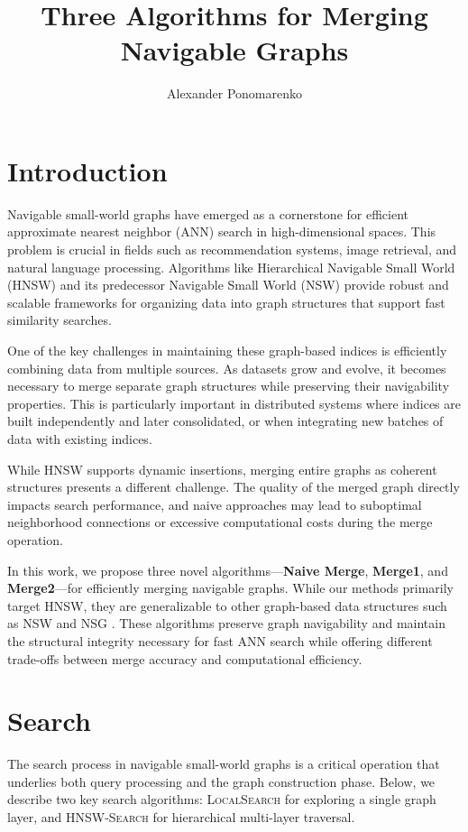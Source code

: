 \documentclass{article}
\title{Three Algorithms for Merging Navigable Graphs}
\author[1]{Alexander Ponomarenko}
\date{}
\affil[1]{HSE Univerity}
\begin{document}
\maketitle

\section{Introduction}
Navigable small-world graphs have emerged as a cornerstone for efficient approximate nearest neighbor (ANN) search in high-dimensional spaces. This problem is crucial in fields such as recommendation systems, image retrieval, and natural language processing. Algorithms like Hierarchical Navigable Small World (HNSW) \cite{hnsw} and its predecessor Navigable Small World (NSW) \cite{nsw2011,nsw2012,nsw2014} provide robust and scalable frameworks for organizing data into graph structures that support fast similarity searches.

One of the key challenges in maintaining these graph-based indices is efficiently combining data from multiple sources. As datasets grow and evolve, it becomes necessary to merge separate graph structures while preserving their navigability properties. This is particularly important in distributed systems where indices are built independently and later consolidated, or when integrating new batches of data with existing indices.

While HNSW supports dynamic insertions, merging entire graphs as coherent structures presents a different challenge. The quality of the merged graph directly impacts search performance, and naive approaches may lead to suboptimal neighborhood connections or excessive computational costs during the merge operation.

In this work, we propose three novel algorithms—\textbf{Naive Merge}, \textbf{Merge1}, and \textbf{Merge2}—for efficiently merging navigable graphs. While our methods primarily target HNSW, they are generalizable to other graph-based data structures such as NSW \cite{nsw2011} and NSG \cite{NSG}. These algorithms preserve graph navigability and maintain the structural integrity necessary for fast ANN search while offering different trade-offs between merge accuracy and computational efficiency.

\section{Search}

The search process in navigable small-world graphs is a critical operation that underlies both query processing and the graph construction phase. Below, we describe two key search algorithms: \textsc{LocalSearch} for exploring a single graph layer, and \textsc{HNSW-Search} for hierarchical multi-layer traversal.
\end{document}
